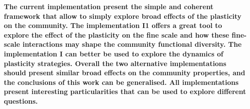 \textbf{The current implementation present the simple and coherent framework that allow to simply explore broad effects of the plasticity on the community. The implementation I1 offers a great tool to explore the effect of the plasticity on the fine scale and how these fine-scale interactions may shape the community functional diversity. The implementation I can better be used to explore the dynamics of plasticity strategies. Overall the two alternative implementations should present similar broad effects on the community properties, and the conclusions of this work can be generalised. All implementations present interesting particularities that can be used to explore different questions. }




